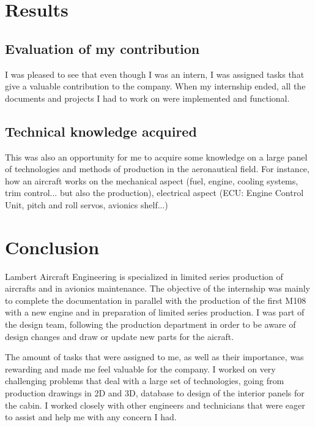 \documentclass[11pt,a4paper]{article}
\begin{document}

\newpage

\section{Results}
\subsection{Evaluation of my contribution}
 I was pleased to see that even though I was an intern, I was assigned tasks that give a valuable contribution to the company. When my internship ended, all the documents and projects I had to work on were implemented and functional.

\subsection{Technical knowledge acquired}
This was also an opportunity for me to acquire some knowledge on a large panel of technologies and methods of production in the aeronautical field. For instance, how an aircraft works on the mechanical aspect (fuel, engine, cooling systems, trim control... but also the production), electrical aspect (ECU: Engine Control Unit, pitch and roll servos, avionics shelf...)

\newpage

\section{Conclusion}
Lambert Aircraft Engineering is specialized in limited series production of aircrafts and in avionics maintenance. The objective of the internship was mainly to complete the documentation in parallel with the production of the first M108 with a new engine and in preparation of limited series production. I was part of the design team, following the production department in order to be aware of design changes and draw or update new parts for the aicraft.

\bigskip

The amount of tasks that were assigned to me, as well as their importance, was rewarding and made me feel valuable for the company. I worked on very challenging problems that deal with a large set of technologies, going from production drawings in 2D and 3D, database to design of the interior panels for the cabin. I worked closely with other engineers and technicians that were eager to assist and help me with any concern I had.
\end{document}
